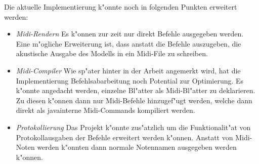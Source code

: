 Die aktuelle Implementierung k"onnte noch in folgenden Punkten erweitert werden:
\begin{itemize}
\item \emph{Midi-Rendern} Es k"onnen zur zeit nur direkt Befehle ausgegeben 
werden. Eine m"ogliche Erweiterung ist, dass anstatt die Befehle auszugeben,
die akustische Ausgabe des Modells in ein Midi-File zu schreiben. 

\item \emph{Midi-Compiler} Wie sp"ater hinter in der Arbeit angemerkt wird, hat
die Implementierung Befehlsabarbeitung noch Potential zur Optimierung. Es k"onnte
angedacht werden, einzelne Bl"atter als Midi-Bl"atter zu deklarieren. Zu diesen
k"onnen dann nur Midi-Befehle hinzugef"ugt werden, welche dann direkt als javainterne
Midi-Commands kompiliert werden.

\item \emph{Protokollierung} Das Projekt k"onnte zus"atzlich um die Funktionalit"at
von Protokollausgaben der Befehle erweitert werden k"onnen. Anstatt von Midi-Noten
werden k"onnten dann normale Notennamen ausgegeben werden k"onnen. 

\end{itemize}

